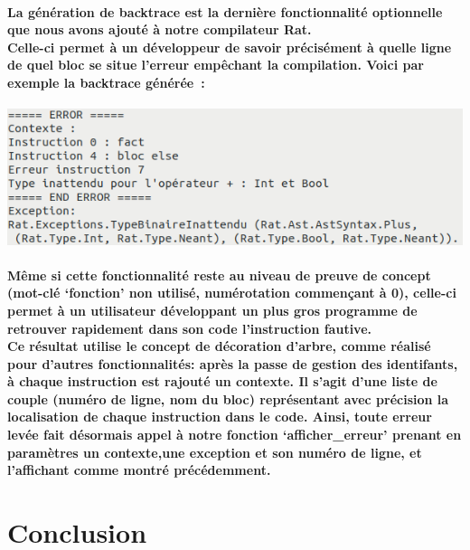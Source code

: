 \documentclass[french]{article}
\begin{document}
\paragraph*{La génération de backtrace est la dernière fonctionnalité optionnelle que nous avons ajouté à notre compilateur Rat. \\
Celle-ci permet à un développeur de savoir précisément à quelle ligne de quel bloc se situe l'erreur empêchant la compilation. 
Voici par exemple la backtrace générée~:}

\begin{center}
        
\end{center}
\includegraphics[width=\textwidth]{backtrace.png}

\paragraph*{Même si cette fonctionnalité reste au niveau de preuve de concept (mot-clé `fonction' non utilisé, numérotation commençant à 0), celle-ci
permet à un utilisateur développant un plus gros programme de retrouver rapidement dans son code l'instruction fautive. \\
Ce résultat utilise le concept de décoration d'arbre, comme réalisé pour d'autres fonctionnalités: après la passe de gestion des identifants,
à chaque instruction est rajouté un contexte. Il s'agit d'une liste de couple (numéro de ligne, nom du bloc) représentant avec précision la localisation
de chaque instruction dans le code. Ainsi, toute erreur levée fait désormais appel à notre fonction `afficher\_erreur' prenant en paramètres
un contexte,une exception et son numéro de ligne, et l'affichant comme montré précédemment.}

\section{Conclusion}
\end{document}
